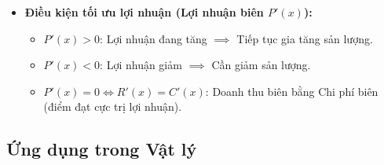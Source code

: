 \documentclass[12pt,a4paper]{article}
\begin{document}
\begin{itemize}
\begin{itemize}
    Dựa vào dấu của  $P'(x)$ để quyết định:
    \item \textbf{Điều kiện tối ưu lợi nhuận (Lợi nhuận biên $P'(x)$):}
    \begin{itemize}
        \item $P'(x) > 0$: Lợi nhuận đang tăng $\implies$ Tiếp tục gia tăng sản lượng.
        \item $P'(x) < 0$: Lợi nhuận giảm $\implies$ Cần giảm sản lượng.
        \item $P'(x) = 0 \iff R'(x) = C'(x)$: Doanh thu biên bằng Chi phí biên (điểm đạt cực trị lợi nhuận).
    \end{itemize}
\end{itemize}
\end{itemize}

\subsection{Ứng dụng trong Vật lý}
\end{document}
